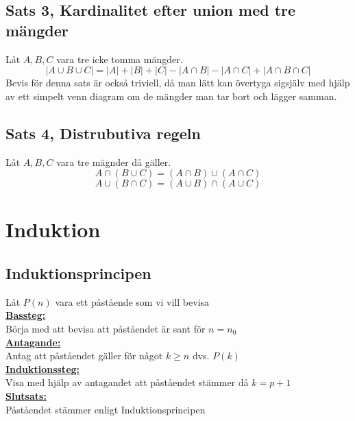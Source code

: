 \documentclass{article}
\begin{document}
	\subsection{Sats 3, Kardinalitet efter union med tre mängder}
	Låt $A, B, C$ vara tre icke tomma mängder.
	$$ |A \cup B \cup C| = |A| + |B| + |C| - |A \cap B| - |A \cap C| + |A \cap B \cap C| $$
	Bevis för denna sats är också triviell, då man lätt kan övertyga sigsjälv med hjälp av ett simpelt venn diagram om de mängder man tar bort och lägger samman. 

	\subsection{Sats 4, Distrubutiva regeln}
	Låt $A, B, C$ vara tre mägnder då gäller. 
	$$ A \cap (B \cup C) = (A \cap B) \cup (A \cap C) $$
	$$ A \cup (B \cap C) = (A \cup B) \cap (A \cup C) $$
	\newpage
		
	\section{Induktion}
	\subsection{Induktionsprincipen}
	Låt $P(n)$ vara ett påstående som vi vill bevisa\\
	\textbf{\underline{Bassteg:}} \\
	Börja med att bevisa att påståendet är sant för $n = n_{0}$ \\
	\textbf{\underline{Antagande:}}\\
	Antag att påståendet gäller för något $k \geq n$ dvs. $P(k)$ \\
	\textbf{\underline{Induktionssteg:}} \\
	Visa med hjälp av antagandet att påståendet stämmer då $k = p + 1$ \\
	\textbf{\underline{Slutsats:}} \\
	Påståendet stämmer enligt Induktionsprincipen \\
\end{document}
